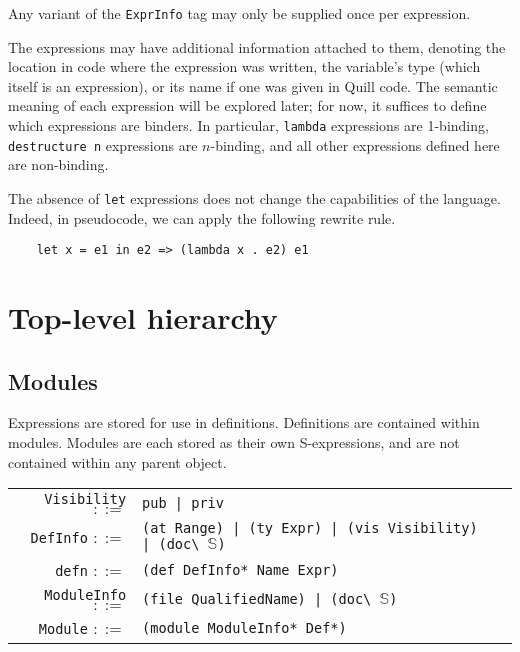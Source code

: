 \documentclass[UKenglish, 11pt, a4paper, parskip=half]{scrbook}
\newcommand{\inlinecode}[1]{\lstinline{#1}}
\begin{document}

Any variant of the \inlinecode{ExprInfo} tag may only be supplied once per expression.

The expressions may have additional information attached to them, denoting the location in code where the expression was written, the variable's type (which itself is an expression), or its name if one was given in Quill code.
The semantic meaning of each expression will be explored later; for now, it suffices to define which expressions are binders.
In particular, \inlinecode{lambda} expressions are 1-binding, \inlinecode{destructure n} expressions are \( n \)-binding, and all other expressions defined here are non-binding.

The absence of \inlinecode{let} expressions does not change the capabilities of the language.
Indeed, in pseudocode, we can apply the following rewrite rule.
\begin{lstlisting}
    let x = e1 in e2 => (lambda x . e2) e1
\end{lstlisting}

\section{Top-level hierarchy}

\subsection{Modules}

Expressions are stored for use in definitions.
Definitions are contained within modules.
Modules are each stored as their own S-expressions, and are not contained within any parent object.

\begin{tabular}{r l p{7cm}}
    \inlinecode{Visibility} \( ::= \) & \inlinecode{pub | priv} \\
    \inlinecode{DefInfo} \( ::= \) & \inlinecode{(at Range) | (ty Expr) | (vis Visibility) | (doc\ }\( \mathbb S \)\inlinecode{)} \\
    \inlinecode{defn} \( ::= \) & \inlinecode{(def DefInfo* Name Expr)} \\
    \inlinecode{ModuleInfo} \( ::= \) & \inlinecode{(file QualifiedName) | (doc\ }\( \mathbb S \)\inlinecode{)} \\
    \inlinecode{Module} \( ::= \) & \inlinecode{(module ModuleInfo* Def*)}
\end{tabular}
\end{document}
